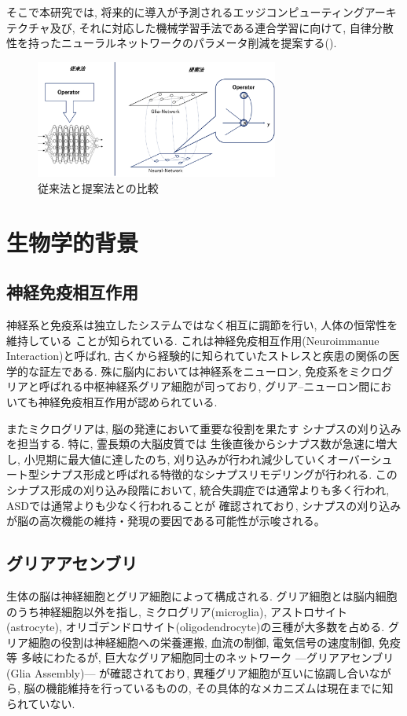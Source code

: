\documentclass[a4paper,10.5pt,twocolumn]{jsarticle}
\begin{document}
そこで本研究では, 将来的に導入が予測されるエッジコンピューティングアーキテクチャ及び, 
それに対応した機械学習手法である連合学習に向けて, 
自律分散性を持ったニューラルネットワークのパラメータ削減を提案する().
\begin{figure}[H]
  \centering
  \includegraphics[width=8cm]{Method.pdf}
  \caption{従来法と提案法との比較}
  \label{fig:Method}
\end{figure}
\section{生物学的背景}
\subsection{神経免疫相互作用}
神経系と免疫系は独立したシステムではなく相互に調節を行い, 人体の恒常性を維持している
ことが知られている.
これは神経免疫相互作用(Neuroimmanue Interaction)と呼ばれ, 
古くから経験的に知られていたストレスと疾患の関係の医学的な証左である.
殊に脳内においては神経系をニューロン, 免疫系をミクログリアと呼ばれる中枢神経系グリア細胞が司っており, 
グリア--ニューロン間においても神経免疫相互作用が認められている\cite{Neuron-Glia}.

またミクログリアは, 脳の発達において重要な役割を果たす
シナプスの刈り込みを担当する.
特に, 霊長類の大脳皮質では
生後直後からシナプス数が急速に増大し, 小児期に最大値に達したのち, 
刈り込みが行われ減少していくオーバーシュート型シナプス形成と呼ばれる特徴的なシナプスリモデリングが行われる.
このシナプス形成の刈り込み段階において, 
統合失調症では通常よりも多く行われ, ASDでは通常よりも少なく行われることが
確認されており, シナプスの刈り込みが脳の高次機能の維持・発現の要因である可能性が示唆される。
\subsection{グリアアセンブリ}
\label{sec:g-asem}
生体の脳は神経細胞とグリア細胞によって構成される.
グリア細胞とは脳内細胞のうち神経細胞以外を指し, 
ミクログリア(microglia), アストロサイト(astrocyte),
オリゴデンドロサイト(oligodendrocyte)の三種が大多数を占める.
グリア細胞の役割は神経細胞への栄養運搬, 血流の制御, 電気信号の速度制御, 免疫等
多岐にわたるが, 巨大なグリア細胞同士のネットワーク 
---グリアアセンブリ(Glia Assembly)--- 
が確認されており, 異種グリア細胞が互いに協調し合いながら, 
脳の機能維持を行っているものの, 
その具体的なメカニズムは現在までに知られていない.
\end{document}
